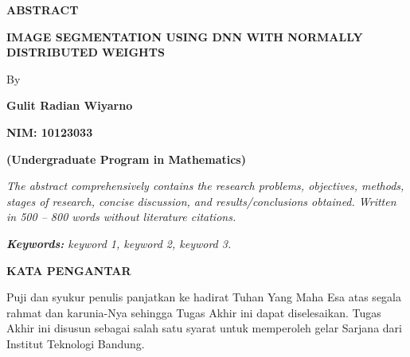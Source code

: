 \documentclass[12pt,a4paper,oneside]{book}
\begin{document}
\newpage
\thispagestyle{plain}
\begin{center}
    {\fontsize{14}{17}\bfseries ABSTRACT\par}
    \vspace{1.0cm}
    {\fontsize{14}{17}\bfseries IMAGE SEGMENTATION USING DNN WITH NORMALLY DISTRIBUTED WEIGHTS\par}
    \vspace{0.8cm}
    {\fontsize{12}{15} By\par}
    \vspace{0.2cm}
    {\fontsize{14}{17}\bfseries Gulit Radian Wiyarno\par}
    \vspace{0.2cm}
    {\fontsize{14}{17}\bfseries NIM: 10123033\par}
    \vspace{0.2cm}
    {\fontsize{14}{17}\bfseries (Undergraduate Program in Mathematics)\par}
\end{center}

\vspace{1.0cm}
\noindent
\textit{The abstract comprehensively contains the research problems, objectives, methods, stages of research, concise discussion, and results/conclusions obtained. Written in 500 -- 800 words without literature citations.}

\vspace{0.8cm}
\noindent
\textit{\textbf{Keywords:} keyword 1, keyword 2, keyword 3.}

\newpage
\thispagestyle{plain}
\begin{center}
    {\fontsize{14}{17}\bfseries KATA PENGANTAR\par}
\end{center}
\vspace{0.8cm}

Puji dan syukur penulis panjatkan ke hadirat Tuhan Yang Maha Esa atas segala rahmat dan karunia-Nya sehingga Tugas Akhir ini dapat diselesaikan. Tugas Akhir ini disusun sebagai salah satu syarat untuk memperoleh gelar Sarjana dari Institut Teknologi Bandung.

\end{document}
